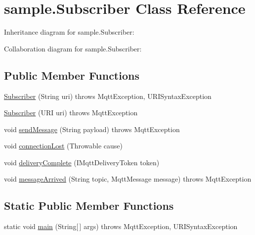 \hypertarget{classsample_1_1_subscriber}{}\section{sample.\+Subscriber Class Reference}
\label{classsample_1_1_subscriber}


Inheritance diagram for sample.\+Subscriber\+:


Collaboration diagram for sample.\+Subscriber\+:
\subsection*{Public Member Functions}
\begin{DoxyCompactItemize}
\item 
\mbox{\hyperlink{classsample_1_1_subscriber_ab8237e28d40bcc69a73ad35407e557a1}{Subscriber}} (String uri)  throws Mqtt\+Exception, U\+R\+I\+Syntax\+Exception 
\item 
\mbox{\hyperlink{classsample_1_1_subscriber_a7f50c2706746360646405ae3469ca374}{Subscriber}} (U\+RI uri)  throws Mqtt\+Exception 
\item 
void \mbox{\hyperlink{classsample_1_1_subscriber_ac15365eaf8f4d15cf8c8263629d186c4}{send\+Message}} (String payload)  throws Mqtt\+Exception 
\item 
void \mbox{\hyperlink{classsample_1_1_subscriber_a9f39d5a464ae51c85400004c6f0b32ed}{connection\+Lost}} (Throwable cause)
\item 
void \mbox{\hyperlink{classsample_1_1_subscriber_a3eb4c82798dcb29cc581c3aabab34107}{delivery\+Complete}} (I\+Mqtt\+Delivery\+Token token)
\item 
void \mbox{\hyperlink{classsample_1_1_subscriber_a3060c3fd5b9078142a96dc2cd9beb7b9}{message\+Arrived}} (String topic, Mqtt\+Message message)  throws Mqtt\+Exception 
\end{DoxyCompactItemize}
\subsection*{Static Public Member Functions}
\begin{DoxyCompactItemize}
\item 
static void \mbox{\hyperlink{classsample_1_1_subscriber_a08afc10c181a3245ba83ed84f3317d1b}{main}} (String\mbox{[}$\,$\mbox{]} args)  throws Mqtt\+Exception, U\+R\+I\+Syntax\+Exception 
\end{DoxyCompactItemize}


